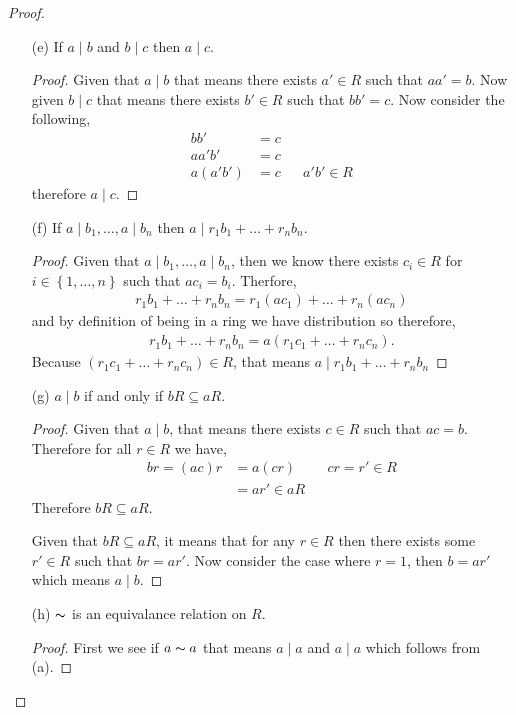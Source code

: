 \documentclass[11pt]{article}
\newcommand{\set}[1]{\left\{#1\right\}} %
\begin{document}
\begin{proof}
\begin{itemize}
\begin{proof}
            Given $a \in R^{\times}$, then it follows from (c) that $a \mid u$.
        \end{proof} 
        \item[(e)] If $a \mid b$ and $b \mid c$ then $a \mid c$.
        \begin{proof}
            Given that $a \mid b$ that means there exists $a' \in R$ such that $aa' = b$. Now given $b\mid c$ that means there exists $b' \in R$ such that $bb' = c$. Now consider the following,
            \begin{align*}
                bb' &= c \\
                aa'b' &= c\\
                a(a'b')&= c && a'b' \in R
            \end{align*}
            therefore $a \mid c$.
        \end{proof} 
        \item[(f)] If $a \mid b_1, \dots, a \mid b_n$ then $a\mid r_1b_1 + \dots + r_n b_n$.
        \begin{proof}
            Given that $a \mid b_1, \dots, a\mid b_n$, then we know there exists $c_i\in R$ for $i \in \set{1, \dots, n}$ such that $ac_i = b_i$. Therfore,
            \begin{align*}
                 r_1b_1 + \dots + r_nb_n = r_1(ac_1) + \dots + r_n(ac_n) 
            \end{align*} 
            and by definition of being in a ring we have distribution so therefore,
            \begin{align*}
                r_1b_1 + \dots + r_nb_n =a(r_1c_1 + \dots +r_nc_n). 
            \end{align*}
            Because $(r_1c_1 + \dots + r_nc_n) \in R$, that means $a \mid r_1b_1 + \dots + r_nb_n$
        \end{proof} 
        \item[(g)] $a\mid b$ if and only if $bR \subseteq aR$.
        \begin{proof}
            Given that $a\mid b$, that means there exists $c \in R$ such that $ac = b$. Therefore for all $r \in R$ we have,
            \begin{align*}
                br = (ac)r &= a(cr) && cr = r' \in R \\
                &= ar'\in aR
            \end{align*}
            Therefore $bR \subseteq aR$.

            Given that $bR \subseteq aR$, it means that for any $r \in R$ then there exists some $r' \in R$ such that $br = ar'$. Now consider the case where $r =1$, then $b = ar'$ which means $a\mid b$.
        \end{proof} 
        \item[(h)] $\thicksim$ is an equivalance relation on $R$.
        \begin{proof}
            First we see if $a \thicksim a$ that means $a\mid a$ and $a \mid a$ which follows from  (a).


\end{proof}
\end{itemize}
\end{proof}
\end{document}
